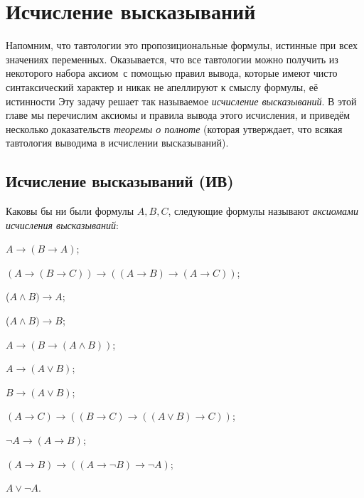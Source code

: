 \chapter{Исчисление высказываний}%
        \label{propositional-calculus}%
Напомним, что тавтологии%
\т это пропозициональные формулы,%
истинные при всех значениях переменных. Оказывается, что все
тавтологии можно получить из некоторого набора  аксиом\ с
помощью  правил вывода, которые имеют чисто синтаксический
характер и никак не апеллируют к смыслу формулы, её истинности
 Эту задачу решает так называемое \emph{исчисление
высказываний}.%
В этой главе мы перечислим аксиомы и правила
вывода этого исчисления, и приведём несколько доказательств
\emph{теоремы о полноте}%
(которая утверждает, что всякая
тавтология%
выводима в исчислении выс\-казываний).

\section{Исчисление высказываний (ИВ)}
        \label{propositional-calculus-axioms}%

Каковы бы ни были формулы $A,B,C$, следующие формулы называют
\emph{аксиомами исчисления высказываний}:%
%
%

 $A\to(B\to A)$;

 $(A\to(B\to C))\to((A\to B)\to
(A \to C))$;

 ($A\land B)\to A$;

 ($A\land B)\to B$;

 $A\to(B\to(A\land B))$;

 $A\to (A\lor B)$;

 $B\to(A\lor B)$;

 $(A\to C) \to ( (B\to C) \to
((A\lor B)\to C))$;

 $\neg A\to(A\to B)$;

 $(A\to B)\to
((A\to \lnot B)\to\lnot A)$;

 $A\lor \neg A$.


